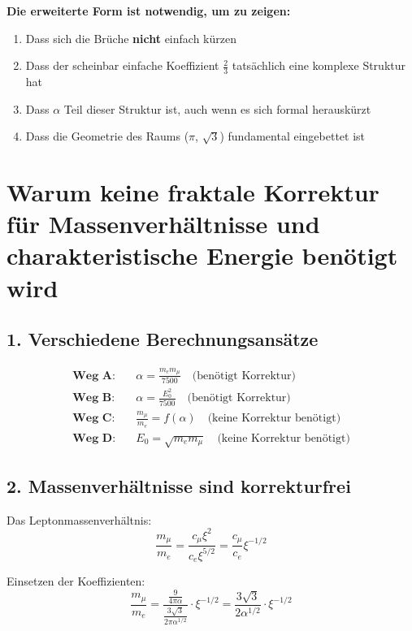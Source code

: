 \begin{tcolorbox}[colback=green!5!white,colframe=green!75!black]
	\textbf{Die erweiterte Form ist notwendig, um zu zeigen:}
	\begin{enumerate}
		\item Dass sich die Brüche \textbf{nicht} einfach kürzen
		\item Dass der scheinbar einfache Koeffizient $\frac{2}{3}$ tatsächlich eine komplexe Struktur hat
		\item Dass $\alpha$ Teil dieser Struktur ist, auch wenn es sich formal herauskürzt
		\item Dass die Geometrie des Raums ($\pi$, $\sqrt{3}$) fundamental eingebettet ist
	\end{enumerate}
\end{tcolorbox}

\section{Warum keine fraktale Korrektur für Massenverhältnisse und charakteristische Energie benötigt wird}

\subsection{1. Verschiedene Berechnungsansätze}

\begin{align*}
	\textbf{Weg A:} &\quad \alpha = \frac{m_e m_\mu}{7500} \quad \text{(benötigt Korrektur)} \\
	\textbf{Weg B:} &\quad \alpha = \frac{E_0^2}{7500} \quad \text{(benötigt Korrektur)} \\
	\textbf{Weg C:} &\quad \frac{m_\mu}{m_e} = f(\alpha) \quad \text{(keine Korrektur benötigt)} \\
	\textbf{Weg D:} &\quad E_0 = \sqrt{m_e m_\mu} \quad \text{(keine Korrektur benötigt)}
\end{align*}

\subsection{2. Massenverhältnisse sind korrekturfrei}

Das Leptonmassenverhältnis:
\[
\frac{m_\mu}{m_e} = \frac{c_\mu \xi^2}{c_e \xi^{5/2}} = \frac{c_\mu}{c_e} \xi^{-1/2}
\]

Einsetzen der Koeffizienten:
\[
\frac{m_\mu}{m_e} = \frac{\frac{9}{4\pi\alpha}}{\frac{3\sqrt{3}}{2\pi\alpha^{1/2}}} \cdot \xi^{-1/2} = \frac{3\sqrt{3}}{2\alpha^{1/2}} \cdot \xi^{-1/2}
\]


